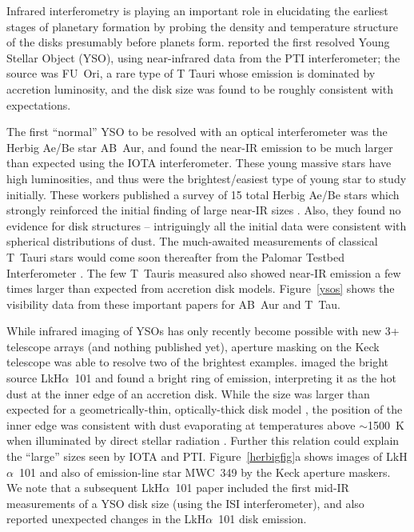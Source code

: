 \documentclass[12pt]{iopart}
\begin{document}
Infrared interferometry is playing an important role in elucidating
the earliest stages of planetary formation by probing the density and
temperature structure of the disks presumably before planets form.
\citet{malbet1998} reported the first resolved Young Stellar Object
(YSO), using near-infrared data from the PTI interferometer; the
source was FU~Ori, a rare type of T Tauri whose emission is dominated
by accretion luminosity, and the disk size was found to be roughly
consistent with expectations.

The first ``normal'' YSO to be resolved with an optical interferometer
was the Herbig Ae/Be star AB~Aur, and \citet{rmg1999a} found the
near-IR emission to be much larger than expected using the IOTA
interferometer.  These young massive stars have high luminosities, and
thus were the brightest/easiest type of young star to study initially.
These workers published a survey of 15 total Herbig Ae/Be stars which
strongly reinforced the initial finding of large near-IR sizes
\citep{millangabetthesis,millangabet2001}. Also, they found no
evidence for disk structures -- intriguingly all the initial data were
consistent with spherical distributions of dust.  The much-awaited
measurements of classical T~Tauri stars would come soon thereafter
from the Palomar Testbed Interferometer \citep{akeson2000,akeson2002}.
The few T~Tauris measured also showed near-IR emission a few times
larger than expected from accretion disk models. Figure~\ref{ysos}
shows the visibility data from these important papers for AB~Aur and
T~Tau.  

While infrared imaging of YSOs has only recently become possible with
new 3+ telescope arrays (and nothing published yet), aperture masking
on the Keck telescope was able to resolve two of the brightest
examples.  \citet{tuthill2001a,tuthill2002} imaged the bright source
LkH$\alpha$~101 and found a bright ring of emission, interpreting it
as the hot dust at the inner edge of an accretion disk.  While the
size was larger than expected for a geometrically-thin,
optically-thick disk model \citep[e.g.,][]{hillenbrand1992}, the
position of the inner edge was consistent with dust evaporating at
temperatures above $\sim$1500~K when illuminated by direct stellar
radiation \citep[the standard paradigm for dust shells around evolved
stars; see][]{rrh1982,dyck1984}.  Further this relation could explain
the ``large'' sizes seen by IOTA and PTI.
Figure~\ref{herbigfig}a
shows images of LkH$\alpha$~101 and also of emission-line star MWC~349
by the Keck aperture maskers.  We note that a subsequent
LkH$\alpha$~101 paper \citep{tuthill2002} included the first mid-IR
measurements of a YSO disk size (using the ISI interferometer), and
also reported unexpected changes in the LkH$\alpha$~101 disk emission.
\end{document}
